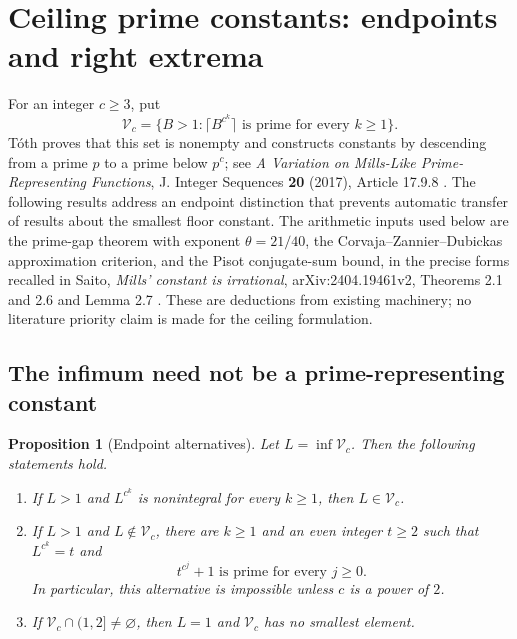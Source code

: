 \documentclass[11pt,a4paper]{article}
\newtheorem{proposition}[theorem]{Proposition}
\theoremstyle{definition}
\theoremstyle{remark}
\numberwithin{equation}{section}
\begin{document}
\section{Ceiling prime constants: endpoints and right extrema}
\label{tw:sec:ceiling-new}

For an integer $c\geq3$, put
\[
 \mathcal V_c=\{B>1:\lceil B^{c^k}\rceil\text{ is prime for every }k\geq1\}.
\]
T\'oth proves that this set is nonempty and constructs constants by
descending from a prime $p$ to a prime below $p^c$; see
\emph{A Variation on Mills-Like Prime-Representing Functions},
J. Integer Sequences \textbf{20} (2017), Article 17.9.8 \cite{Toth2017}.
The following results address an endpoint distinction that prevents
automatic transfer of results about the smallest floor constant.
The arithmetic inputs used below are the prime-gap theorem with exponent
$\theta=21/40$, the Corvaja--Zannier--Dubickas approximation criterion,
and the Pisot conjugate-sum bound, in the precise forms recalled in
Saito, \emph{Mills' constant is irrational}, arXiv:2404.19461v2,
Theorems 2.1 and 2.6 and Lemma 2.7 \cite{SaitoMills}.
These are deductions from existing machinery; no literature priority
claim is made for the ceiling formulation.

\subsection{The infimum need not be a prime-representing constant}

\begin{proposition}[Endpoint alternatives]\label{tw:prop:ceil-endpoint}
Let $L=\inf\mathcal V_c$. Then the following statements hold.
\begin{enumerate}
\item If $L>1$ and $L^{c^k}$ is nonintegral for every $k\geq1$,
then $L\in\mathcal V_c$.
\item If $L>1$ and $L\notin\mathcal V_c$, there are $k\geq1$ and
an even integer $t\geq2$ such that $L^{c^k}=t$ and
\[
 t^{c^j}+1\text{ is prime for every }j\geq0.
\]
In particular, this alternative is impossible unless $c$ is a power of $2$.
\item If $\mathcal V_c\cap(1,2]\ne\varnothing$, then
$L=1$ and $\mathcal V_c$ has no smallest element.
\end{enumerate}
\end{proposition}
\end{document}
